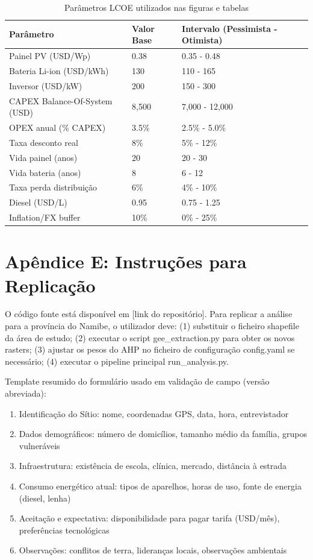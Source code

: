 \documentclass[12pt, a4paper]{article}
\begin{document}
\begin{table}[H]
\centering
\small
\begin{tabular}{lll}
\toprule
\rowcolor{LightBlue}Parâmetro & Valor Base & Intervalo (Pessimista - Otimista) \\
\midrule
Painel PV (USD/Wp) & 0.38 & 0.35 - 0.48 \\
Bateria Li-ion (USD/kWh) & 130 & 110 - 165 \\
Inversor (USD/kW) & 200 & 150 - 300 \\
CAPEX Balance-Of-System (USD) & 8,500 & 7,000 - 12,000 \\
OPEX anual (\% CAPEX) & 3.5\% & 2.5\% - 5.0\% \\
Taxa desconto real & 8\% & 5\% - 12\% \\
Vida painel (anos) & 20 & 20 - 30 \\
Vida bateria (anos) & 8 & 6 - 12 \\
Taxa perda distribuição & 6\% & 4\% - 10\% \\
Diesel (USD/L) & 0.95 & 0.75 - 1.25 \\
Inflation/FX buffer & 10\% & 0\% - 25\% \\
\bottomrule
\end{tabular}
\caption{Parâmetros LCOE utilizados nas figuras e tabelas}
\end{table}

\section*{Apêndice E: Instruções para Replicação}

O código fonte está disponível em [link do repositório]. Para replicar a análise para a província do Namibe, o utilizador deve: (1) substituir o ficheiro shapefile da área de estudo; (2) executar o script gee\_extraction.py para obter os novos rasters; (3) ajustar os pesos do AHP no ficheiro de configuração config.yaml se necessário; (4) executar o pipeline principal run\_analysis.py.

Template resumido do formulário usado em validação de campo (versão abreviada):

\begin{enumerate}
\item Identificação do Sítio: nome, coordenadas GPS, data, hora, entrevistador
\item Dados demográficos: número de domicílios, tamanho médio da família, grupos vulneráveis
\item Infraestrutura: existência de escola, clínica, mercado, distância à estrada
\item Consumo energético atual: tipos de aparelhos, horas de uso, fonte de energia (diesel, lenha)
\item Aceitação e expectativa: disponibilidade para pagar tarifa (USD/mês), preferências tecnológicas
\item Observações: conflitos de terra, lideranças locais, observações ambientais
\end{enumerate}
\end{document}
